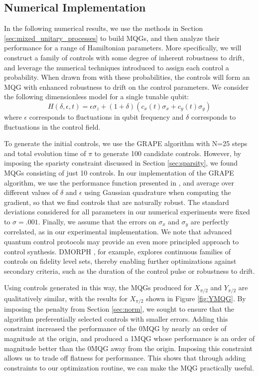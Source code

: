 \documentclass[aps,nofootinbib,pra,notitlepage,twocolumn]{revtex4-1}
\newcommand{\0}{\ensuremath{\mathbf{0}}}
\begin{document}
{\subsection{Numerical Implementation}
\label{sec:numerical_results}
\noindent In the following numerical results, we use the methods in Section \ref{sec:mixed_unitary_processes} to build MQGs, and then analyze their performance for a range of Hamiltonian parameters. More specifically, we will construct a family of controls with some degree of inherent robustness to drift, and leverage the numerical techniques introduced to assign each control a probability. When drawn from with these probabilities, the controls will form an MQG with enhanced robustness to drift on the control parameters. We consider the following dimensionless model for a single tunable qubit: 
\begin{equation}\label{eq:1Qham}
  H(\delta, \epsilon, t) = \epsilon\sigma_z + (1 + \delta)(c_x(t)\sigma_x + c_y(t)\sigma_y)
\end{equation}
where $\epsilon$ corresponds to fluctuations in qubit frequency and $\delta$ corresponds to fluctuations in the control field.

To generate the initial controls, we use the GRAPE algorithm\cite{Khaneja2005} with N=25 steps and total evolution time of $\pi$ to generate 100 candidate controls. However, by imposing the sparisty constraint discussed in Section \ref{sec:sparsity}, we found MQGs consisting of just 10 controls. In our implementation of the GRAPE algorithm, we use the performance function presented in \cite{Khaneja2005}, and average over different values of $\delta$ and $\epsilon$ using Gaussian quadrature when computing the gradient, so that we find controls that are naturally robust. The standard deviations considered for all parameters in our numerical experiments were fixed to $\sigma=.001$. Finally, we assume that the errors on $\sigma_x$ and $\sigma_y$ are perfectly correlated, as in our experimental implementation. We note that advanced quantum control protocols may provide an even more principled approach to control synthesis. DMORPH \cite{dominy2008exploring}, for example, explores continuous families of controls on fidelity level sets, thereby enabling further optimizations against secondary criteria, such as the duration of the control pulse or robustness to drift. 

Using controls generated in this way, the MQGs produced for $X_{\pi/2}$ and $Y_{\pi/2}$ are qualitatively similar, with the results for $X_{\pi/2}$ shown in Figure \ref{fig:YMQG}. By imposing the penalty from Section \ref{sec:norm}, we sought to ensure that the algorithm preferentially selected controls with smaller errors. Adding this constraint increased the performance of the 0MQG by nearly an order of magnitude at the origin, and produced a 1MQG whose performance is an order of magnitude better than the 0MQG away from the origin. Imposing this constraint allows us to trade off flatness for performance. This shows that through adding constraints to our optimization routine, we can make the MQG practically useful. 

}
\end{document}
